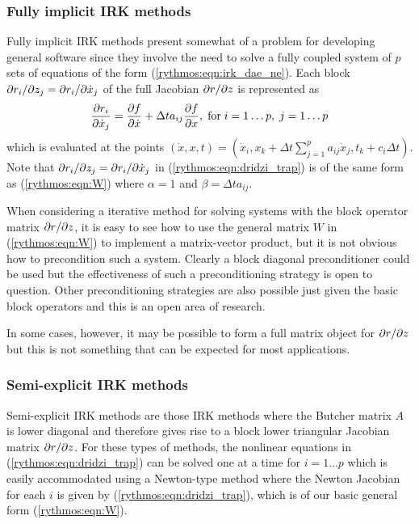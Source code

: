 \documentclass[pdf,ps2pdf,11pt]{SANDreport}
\begin{document}
\subsubsection*{Fully implicit IRK methods}

Fully implicit IRK methods present somewhat of a problem for developing
general software since they involve the need to solve a fully coupled system
of $p$ sets of equations of the form (\ref{rythmos:eqn:irk_dae_ne}).  Each
block $\partial r_i / \partial z_j = {}\partial r_i / \partial \dot{x}_j$ of the full Jacobian
$\partial r / \partial z$ is represented as
%
\begin{equation}
\displaystyle{\frac{\partial r_i}{\partial \dot{x}_j}}
= \displaystyle{\frac{\partial f}{\partial \dot{x}}}
+ \Delta t a_{ij} \displaystyle{\frac{\partial f}{\partial x}},
\; \mbox{for} \; i = 1 \ldots p, \; j = 1 \ldots p
\label{rythmos:eqn:dridzi_trap}
\end{equation}
%
which is evaluated at the points $(\dot{x},x,t) = ( {}\dot{x}_i, x_k +
{}\Delta t {}\sum_{j=1}^{p} a_{ij} {}\dot{x}_j, t_k + c_i {}\Delta t )$.  Note
that $\partial r_i / \partial z_j = {}\partial r_i / \partial \dot{x}_j$ in
(\ref{rythmos:eqn:dridzi_trap}) is of the same form as (\ref{rythmos:eqn:W})
where $\alpha = 1$ and $\beta = \Delta t a_{ij}$.

When considering a iterative method for solving systems with the block
operator matrix $\partial r / \partial z$, it is easy to see how to use the general matrix
$W$ in (\ref{rythmos:eqn:W}) to implement a matrix-vector product, but it is
not obvious how to precondition such a system.  Clearly a block diagonal
preconditioner could be used but the effectiveness of such a preconditioning
strategy is open to question.  Other preconditioning strategies are also
possible just given the basic block operators and this is an open area of
research.

In some cases, however, it may be possible to form a full matrix object for
$\partial r / \partial z$ but this is not something that can be expected for most
applications.

\subsubsection*{Semi-explicit IRK methods}

Semi-explicit IRK methods are those IRK methods where the Butcher matrix $A$
is lower diagonal and therefore gives rise to a block lower triangular
Jacobian matrix $\partial r / \partial z$.  For these types of methods, the nonlinear
equations in (\ref{rythmos:eqn:dridzi_trap}) can be solved one at a time for
$i = 1 {}\ldots p$ which is easily accommodated using a Newton-type method
where the Newton Jacobian for each $i$ is given by
(\ref{rythmos:eqn:dridzi_trap}), which is of our basic general form
(\ref{rythmos:eqn:W}).
\end{document}
